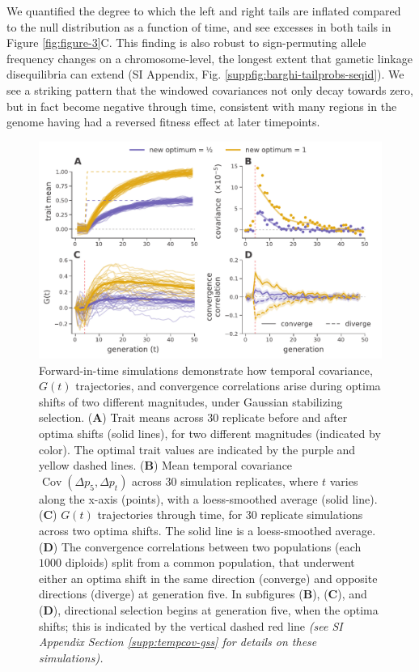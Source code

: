 \documentclass[9pt,twocolumn,twoside]{pnas-new}
\DeclareMathOperator{\cov}{Cov}
\newcommand{\vb}[1]{{\it \color{red} #1}}
\begin{document}
We quantified the degree to which the left and
right tails are inflated compared to the null distribution as a function of
time, and see excesses in both tails in Figure \ref{fig:figure-3}C. This
finding is also robust to sign-permuting allele frequency changes on a
chromosome-level, the longest extent that gametic linkage disequilibria can
extend (SI Appendix, Fig. \ref{suppfig:barghi-tailprobs-seqid}). We see a
striking pattern that the windowed covariances not only decay towards zero, but
in fact become negative through time, consistent with many regions in the
genome having had a reversed fitness effect at later timepoints.

\begin{figure}
  \centering
  \includegraphics[width=15cm]{figure-4.pdf}

  \caption{Forward-in-time simulations demonstrate how temporal covariance,
    $G(t)$ trajectories, and convergence correlations arise during optima
    shifts of two different magnitudes, under Gaussian stabilizing selection.
    ({\bf A}) Trait means across 30 replicate before and after optima shifts
    (solid lines), for two different magnitudes (indicated by color). The
    optimal trait values are indicated by the purple and yellow dashed lines.
    ({\bf B}) Mean temporal covariance $\cov(\Delta p_5, \Delta p_t)$ across 30
    simulation replicates, where $t$ varies along the x-axis (points), with a
    loess-smoothed average (solid line). ({\bf C}) $G(t)$ trajectories through
    time, for 30 replicate simulations across two optima shifts. The solid line
    is a loess-smoothed average. ({\bf D}) The convergence correlations between
    two populations (each $1000$ diploids) split from a common population, that
    underwent either an optima shift in the same direction (converge) and
    opposite directions (diverge) at generation five. In subfigures ({\bf B}),
    ({\bf C}), and ({\bf D}), directional selection begins at generation five,
    when the optima shifts; this is indicated by the vertical dashed red line
    \vb{(see SI Appendix Section \ref{supp:tempcov-gss} for details on these
    simulations).}}

  \label{fig:figure-4}
\end{figure}
\end{document}
